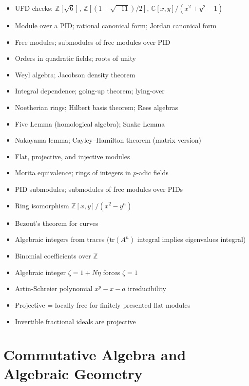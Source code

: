 \documentclass{amsart}
\begin{document}
\begin{itemize}
  \item UFD checks: $\mathbb{Z}[\sqrt6]$, $\mathbb{Z}[(1+\sqrt{-11})/2]$, $\mathbb{C}[x,y]/(x^2+y^2-1)$
  \item Module over a PID; rational canonical form; Jordan canonical form
  \item Free modules; submodules of free modules over PID
  \item Orders in quadratic fields; roots of unity
  \item Weyl algebra; Jacobson density theorem
  \item Integral dependence; going-up theorem; lying-over
  \item Noetherian rings; Hilbert basis theorem; Rees algebras
  \item Five Lemma (homological algebra); Snake Lemma
  \item Nakayama lemma; Cayley--Hamilton theorem (matrix version)
  \item Flat, projective, and injective modules
  \item Morita equivalence; rings of integers in $p$-adic fields
  \item PID submodules; submodules of free modules over PIDs
  \item Ring isomorphism $\mathbb{Z}[x,y]/(x^2-y^n)$
  \item Bezout's theorem for curves
  \item Algebraic integers from traces ($\mathrm{tr}(A^n)$ integral implies eigenvalues integral)
  \item Binomial coefficients over $\mathbb{Z}$
  \item Algebraic integer $\zeta = 1 + N\eta$ forces $\zeta=1$
  \item Artin-Schreier polynomial $x^p-x-a$ irreducibility
  \item Projective = locally free for finitely presented flat modules
  \item Invertible fractional ideals are projective
\end{itemize}

\section{Commutative Algebra and Algebraic Geometry}
\end{document}
